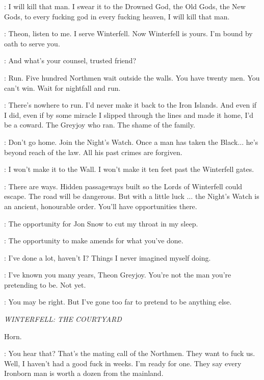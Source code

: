
\THEON: I will kill that man. I swear it to the Drowned God, the Old Gods, the New Gods, to every fucking god in every fucking heaven, I will kill that man. 

\LUWIN: Theon, listen to me. I serve Winterfell. Now Winterfell is yours. I'm bound by oath to serve you. 

\THEON: And what's your counsel, trusted friend? 

\LUWIN: Run. Five hundred Northmen wait outside the walls. You have twenty men. You can't win. Wait for nightfall and run. 

\THEON: There's nowhere to run. I'd never make it back to the Iron Islands. And even if I did, even if by some miracle I slipped through the lines and made it home, I'd be a coward. The Greyjoy who ran. The shame of the family. 

\LUWIN: Don't go home. Join the Night's Watch. Once a man has taken the Black$\ldots$ he's beyond reach of the law. All his past crimes are forgiven. 

\THEON: I won't make it to the Wall. I won't make it ten feet past the Winterfell gates. 

\LUWIN: There are ways. Hidden passageways built so the Lords of Winterfell could escape. The road will be dangerous. But with a little luck $\ldots$ the Night's Watch is an ancient, honourable order. You'll have opportunities there. 

\THEON: The opportunity for Jon Snow to cut my throat in my sleep. 

\LUWIN: The opportunity to make amends for what you've done. 

\THEON: I've done a lot, haven't I? Things I never imagined myself doing. 

\LUWIN:  I've known you many years, Theon Greyjoy. You're not the man you're pretending to be. Not yet. 

\THEON: You may be right. But I've gone too far to pretend to be anything else. 


\scene

\textit{WINTERFELL: THE COURTYARD} 

\sfx Horn.


\THEON: You hear that? That's the mating call of the Northmen. They want to fuck us. Well, I haven't had a good fuck in weeks. I'm ready for one.  They say every Ironborn man is worth a dozen from the mainland. 

